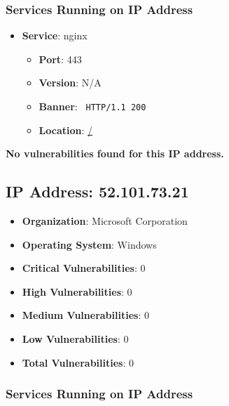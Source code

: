 \documentclass{article}
\begin{document}
\subsubsection*{Services Running on IP Address}

\begin{itemize}
    
        \item \textbf{Service}: nginx
        \begin{itemize}
            \item \textbf{Port}: 443
            \item \textbf{Version}:  N/A 
            \item \textbf{Banner}: \texttt{ HTTP/1.1 200 
 }
            \item \textbf{Location}: \href{ / }{ / }
        \end{itemize}
    
\end{itemize}


\textbf{No vulnerabilities found for this IP address.}


\clearpage



\subsection*{IP Address: 52.101.73.21}

\begin{itemize}
    \item \textbf{Organization}: Microsoft Corporation
    \item \textbf{Operating System}:  Windows 
    \item \textbf{Critical Vulnerabilities}: 0
    \item \textbf{High Vulnerabilities}: 0
    \item \textbf{Medium Vulnerabilities}: 0
    \item \textbf{Low Vulnerabilities}: 0
    \item \textbf{Total Vulnerabilities}: 0
\end{itemize}

\subsubsection*{Services Running on IP Address}
\end{document}
